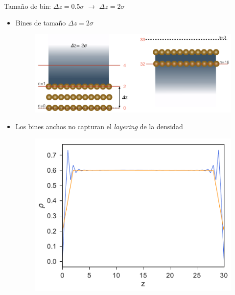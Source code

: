 \documentclass{beamer}
\begin{document}
\begin{frame}{Tamaño de bin: $\Delta z=0.5\sigma$ $\rightarrow$ $\Delta z=2\sigma$}
  \begin{itemize}
\item<1-> Bines de tamaño $\Delta z = 2\sigma$
\begin{figure}[h!]
\includegraphics[width=0.75\linewidth]{bin_size-top-bottom_17nodos_cut}
\end{figure}
\item<2-> Los bines anchos no capturan el \textit{layering} de la densidad
\begin{figure}[h!]
\includegraphics[width=0.48\linewidth]{DensityProfile-WALLS}
\end{figure}
  \end{itemize}
\end{frame}

\end{document}
